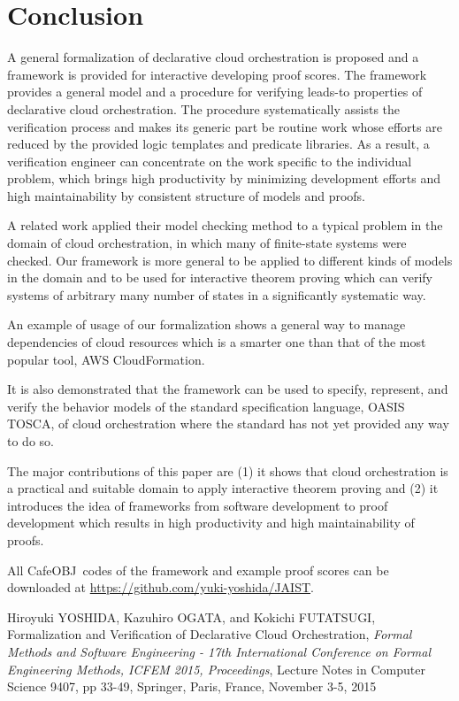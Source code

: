 \documentclass[12pt]{report}
\newcommand{\cafeobj}{{\sf CafeOBJ}~}
\begin{document}
\section{Conclusion}
A general formalization of declarative cloud orchestration is proposed
and a framework is provided for interactive developing proof
scores. The framework provides a general model and a procedure for
verifying leads-to properties of declarative cloud orchestration.  The
procedure systematically assists the verification process and makes
its generic part be routine work whose efforts are reduced by the
provided logic templates and predicate libraries. As a result, a
verification engineer can concentrate on the work specific to the
individual problem, which brings high productivity by minimizing
development efforts and high maintainability by consistent structure
of models and proofs.

A related work applied their model checking method to a typical
problem in the domain of cloud orchestration, in which many of
finite-state systems were checked. Our framework is more general to be
applied to different kinds of models in the domain and to be used for
interactive theorem proving which can verify systems of arbitrary many
number of states in a significantly systematic way.

An example of usage of our formalization shows a general way to manage
dependencies of cloud resources which is a smarter one than that of
the most popular tool, AWS CloudFormation.

It is also demonstrated that the framework can be used to specify,
represent, and verify the behavior models of the standard
specification language, OASIS TOSCA, of cloud orchestration where the
standard has not yet provided any way to do so.

The major contributions of this paper are (1) it shows that cloud
orchestration is a practical and suitable domain to apply interactive
theorem proving and (2) it introduces the idea of frameworks from
software development to proof development which results in high
productivity and high maintainability of proofs.

All \cafeobj codes of the framework and example proof scores
can be downloaded at \url{https://github.com/yuki-yoshida/JAIST}.

\appendix




\begin{publication}

\item
Hiroyuki YOSHIDA, Kazuhiro OGATA, and Kokichi FUTATSUGI,
Formalization and Verification of Declarative Cloud Orchestration,
\emph{Formal Methods and Software Engineering - 17th International Conference
               on Formal Engineering Methods, {ICFEM} 2015, Proceedings}, 
Lecture Notes in Computer Science 9407,
pp 33-49, 
Springer,
Paris, France,
November 3-5, 2015

\end{publication}
\end{document}
